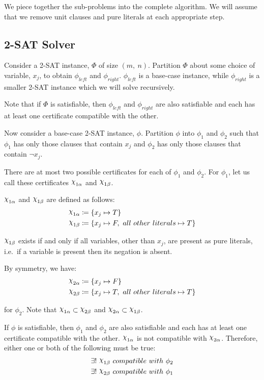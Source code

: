 We piece together the sub-problems into the complete algorithm.
We will assume that we remove unit clauses and pure literals at each appropriate step.


\subsection{2-SAT Solver}
\label{subsec:2-sat-solver}

Consider a 2-SAT instance, $\Phi$ of size $(m,~ n)$.
Partition $\Phi$ about some choice of variable, $x_j$, to obtain $\phi_{left}$ and $\phi_{right}$.
$\phi_{left}$ is a base-case instance, while $\phi_{right}$ is a smaller 2-SAT instance which we will solve recursively.

Note that if $\Phi$ is satisfiable, then $\phi_{left}$ and $\phi_{right}$ are also satisfiable and each has at least one certificate compatible with the other.

Now consider a base-case 2-SAT instance, $\phi$.
Partition $\phi$ into $\phi_1$ and $\phi_2$ such that $\phi_1$ has only those clauses that contain $x_j$ and $\phi_2$ has only those clauses that contain $\lnot x_j$.

There are at most two possible certificates for each of $\phi_1$ and $\phi_2$.
For $\phi_1$, let us call these certificates $\rchi_{1\alpha}$ and $\rchi_{1\beta}$.

$\rchi_{1\alpha}$ and $\rchi_{1\beta}$ are defined as follows:
\begin{align*}
    \rchi_{1\alpha} & \coloneqq \{ x_j \mapsto T \} \\
    \rchi_{1\beta} & \coloneqq \{ x_j \mapsto F,~ all~ other~ literals \mapsto T \}
\end{align*}

$\rchi_{1\beta}$ exists if and only if all variables, other than $x_j$, are present as pure literals, i.e.\ if a variable is present then its negation is absent.

By symmetry, we have:
\begin{align*}
    \rchi_{2\alpha} & \coloneqq \{ x_j \mapsto F \} \\
    \rchi_{2\beta} & \coloneqq \{ x_j \mapsto T,~ all~ other~ literals \mapsto T \}
\end{align*}

for $\phi_2$.
Note that $\rchi_{1\alpha} \subset \rchi_{2\beta}$ and $\rchi_{2\alpha} \subset \rchi_{1\beta}$.

If $\phi$ is satisfiable, then $\phi_1$ and $\phi_2$ are also satisfiable and each has at least one certificate compatible with the other.
$\rchi_{1\alpha}$ is not compatible with $\rchi_{2\alpha}$.
Therefore, either one or both of the following must be true:
\begin{align*}
    \exists !~ & \rchi_{1\beta}~ compatible~ with~ \phi_2 \\
    \exists !~ & \rchi_{2\beta}~ compatible~ with~ \phi_1
\end{align*}

